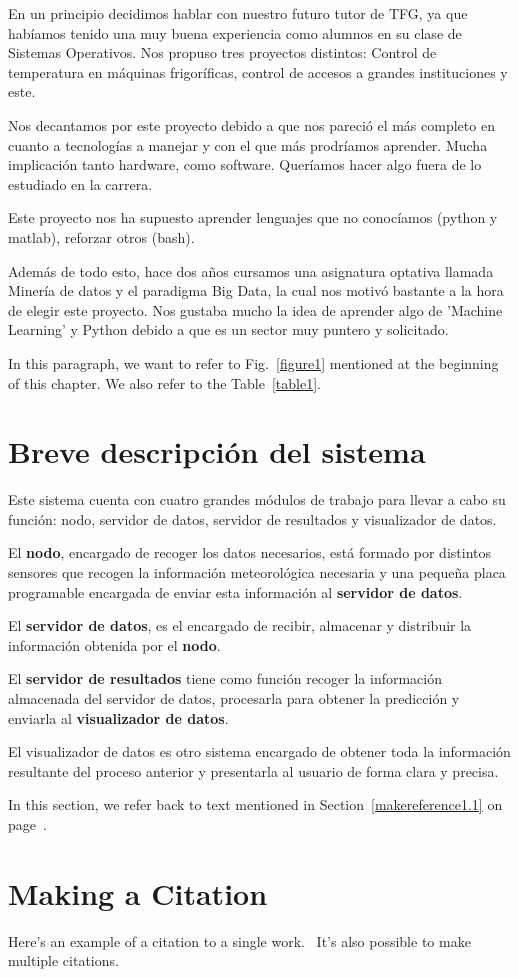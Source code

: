 En un principio decidimos hablar con nuestro futuro tutor de TFG, ya que habíamos tenido una muy buena experiencia como alumnos en su clase de Sistemas Operativos.
Nos propuso tres proyectos distintos: Control de temperatura en máquinas frigoríficas, control de accesos a grandes instituciones y este.

Nos decantamos por este proyecto debido a que nos pareció el más completo en cuanto a tecnologías a manejar y con el que más prodríamos aprender. Mucha implicación tanto hardware, como software. Queríamos hacer algo fuera de lo estudiado en la carrera.

Este proyecto nos ha supuesto aprender lenguajes que no conocíamos (python y matlab), reforzar otros (bash).

Además de todo esto, hace dos años cursamos una asignatura optativa llamada Minería de datos y el paradigma Big Data, la cual nos motivó bastante a la hora de elegir este proyecto. Nos gustaba mucho la idea de aprender algo de 'Machine Learning' y Python debido a que es un sector muy puntero y solicitado.

In this paragraph, we want to refer to Fig.~\ref{figure1}
mentioned at the beginning of this chapter.  We also refer to the
Table~\ref{table1}.

\section{Breve descripción del sistema}
\label{makereference1.2}

Este sistema cuenta con cuatro grandes módulos de trabajo para llevar a cabo su función: nodo, servidor de datos, servidor de resultados y visualizador de datos.

El \textbf{nodo}, encargado de recoger los datos necesarios, está formado por distintos sensores que recogen la información meteorológica necesaria y una pequeña placa programable encargada de enviar esta información al \textbf{servidor de datos}.

El \textbf{servidor de datos}, es el encargado de recibir, almacenar y distribuir la información obtenida por el \textbf{nodo}. 

El \textbf{servidor de resultados} tiene como función recoger la información almacenada del servidor de datos, procesarla para obtener la predicción y enviarla al \textbf{visualizador de datos}.

El visualizador de datos es otro sistema encargado de obtener toda la información resultante del proceso anterior y presentarla al usuario de forma clara y precisa.

In this section, we refer back to text mentioned in
Section~\ref{makereference1.1} on page~\pageref{makereference1.1}.

\section{Making a Citation}
\label{makereference1.3}

Here's an example of a citation to a single
work.~\cite{CT:Weiner:1999} It's also possible to make multiple
citations.~\cite{CT:Phillips:1985, ARP:Loy:1974}
